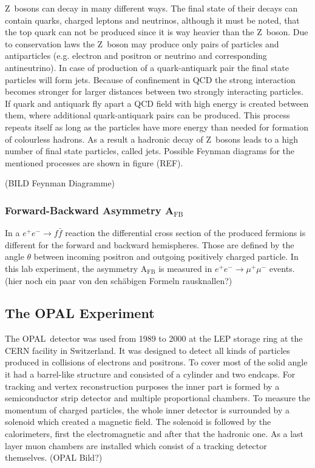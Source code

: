 \documentclass[11pt, a4paper]{article}
\numberwithin{equation}{section}
\newcommand{\korr}[1]{{\color{red}(#1)}}
\begin{document}
Z~bosons can decay in many different ways.
The final state of their decays can contain quarks, charged leptons and neutrinos, although it must be noted, that the top quark can not be produced since it is way heavier than the Z~boson.
Due to conservation laws the Z~boson may produce only pairs of particles and antiparticles (e.g. electron and positron or neutrino and corresponding antineutrino).
In case of production of a quark-antiquark pair the final state particles will form jets.
Because of confinement in QCD the strong interaction becomes stronger for larger distances between two strongly interacting particles.
If quark and antiquark fly apart a QCD field with high energy is created between them, where additional quark-antiquark pairs can be produced.
This process repeats itself as long as the particles have more energy than needed for formation of colourless hadrons.
As a result a hadronic decay of Z~bosons leads to a high number of final state particles, called jets.
Possible Feynman diagrams for the mentioned processes are shown in figure \korr{REF}.

\korr{BILD Feynman Diagramme}

\subsubsection{Forward-Backward Asymmetry A$_\mathrm{FB}$}

In a $e^+e^- \rightarrow f\bar{f}$ reaction the differential cross section of the produced fermions is different for the forward and backward hemispheres.
Those are defined by the angle $\theta$ between incoming positron and outgoing positively charged particle.
In this lab experiment, the asymmetry A$_\mathrm{FB}$ is measured in $e^+e^- \rightarrow \mu^+\mu^-$ events. 
\korr{hier noch ein paar von den schäbigen Formeln rausknallen?}

\subsection{The OPAL Experiment}

The OPAL~detector was used from 1989 to 2000 at the LEP storage ring at the CERN facility in Switzerland.
It was designed to detect all kinds of particles produced in collisions of electrons and positrons.
To cover most of the solid angle it had a barrel-like structure and consisted of a cylinder and two endcaps.
For tracking and vertex reconstruction purposes the inner part is formed by a semiconductor strip detector and multiple proportional chambers.
To measure the momentum of charged particles, the whole inner detector is surrounded by a solenoid which created a magnetic field.
The solenoid is followed by the calorimeters, first the electromagnetic and after that the hadronic one.
As a last layer muon chambers are installed which consist of a tracking detector themselves.
\korr{OPAL Bild?}
\end{document}
